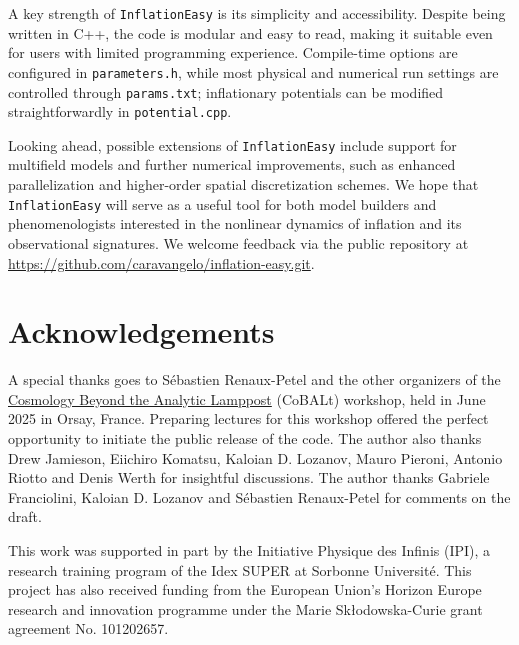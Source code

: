 \documentclass[aps, nofootinbib,superscriptaddress, preprintnumbers, longbibliography]{article}
\begin{document}
A key strength of \texttt{InflationEasy} is its simplicity and accessibility. Despite being written in C++, the code is modular and easy to read, making it suitable even for users with limited programming experience. Compile-time options are configured in \texttt{parameters.h}, while most physical and numerical run settings are controlled through \texttt{params.txt}; inflationary potentials can be modified straightforwardly in \texttt{potential.cpp}.

Looking ahead, possible extensions of \texttt{InflationEasy} include support for multifield models and further numerical improvements, such as enhanced parallelization and higher-order spatial discretization schemes. We hope that \texttt{InflationEasy} will serve as a useful tool for both model builders and phenomenologists interested in the nonlinear dynamics of inflation and its observational signatures. We welcome feedback via the public repository at \href{https://github.com/caravangelo/inflation-easy.git}{https://github.com/caravangelo/inflation-easy.git}.

	\section*{Acknowledgements}

A special thanks goes to S\'ebastien Renaux-Petel and the other organizers of the \href{https://indico.ijclab.in2p3.fr/event/11373/}{Cosmology Beyond the Analytic Lamppost} (CoBALt) workshop, held in June 2025 in Orsay, France. Preparing lectures for this workshop offered the perfect opportunity to initiate the public release of the code. The author also thanks Drew Jamieson, Eiichiro Komatsu, Kaloian D. Lozanov, Mauro Pieroni, Antonio Riotto and Denis Werth for insightful discussions. The author thanks Gabriele Franciolini, Kaloian D. Lozanov and S\'ebastien Renaux-Petel for comments on the draft.

This work was supported in part by the Initiative Physique des Infinis (IPI), a research training program of the Idex SUPER at Sorbonne Universit\'e. This project has also received funding from the European Union’s Horizon Europe research and innovation programme under the Marie Skłodowska-Curie grant agreement No. 101202657.

	
	
	
	
\end{document}
